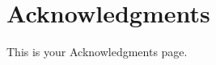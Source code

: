 \documentclass[./dissertation.tex]{subfiles}
\begin{document}
  \chapter*{Acknowledgments}


  This is your Acknowledgments page.
\end{document}

